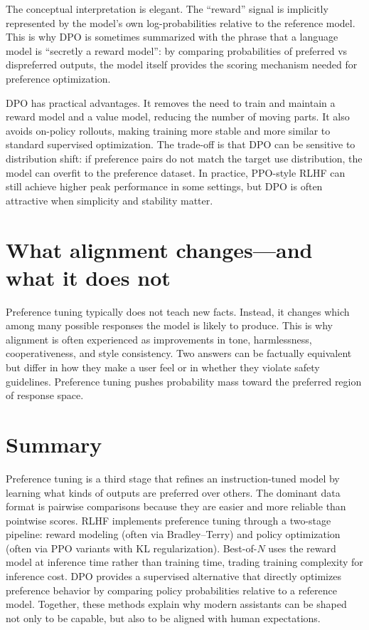 The conceptual interpretation is elegant. The “reward” signal is implicitly represented by the model’s own log-probabilities relative to the reference model. This is why DPO is sometimes summarized with the phrase that a language model is “secretly a reward model”: by comparing probabilities of preferred vs dispreferred outputs, the model itself provides the scoring mechanism needed for preference optimization.

DPO has practical advantages. It removes the need to train and maintain a reward model and a value model, reducing the number of moving parts. It also avoids on-policy rollouts, making training more stable and more similar to standard supervised optimization. The trade-off is that DPO can be sensitive to distribution shift: if preference pairs do not match the target use distribution, the model can overfit to the preference dataset. In practice, PPO-style RLHF can still achieve higher peak performance in some settings, but DPO is often attractive when simplicity and stability matter.

\section{What alignment changes—and what it does not}
Preference tuning typically does not teach new facts. Instead, it changes which among many possible responses the model is likely to produce. This is why alignment is often experienced as improvements in tone, harmlessness, cooperativeness, and style consistency. Two answers can be factually equivalent but differ in how they make a user feel or in whether they violate safety guidelines. Preference tuning pushes probability mass toward the preferred region of response space.

\section{Summary}
Preference tuning is a third stage that refines an instruction-tuned model by learning what kinds of outputs are preferred over others. The dominant data format is pairwise comparisons because they are easier and more reliable than pointwise scores. RLHF implements preference tuning through a two-stage pipeline: reward modeling (often via Bradley--Terry) and policy optimization (often via PPO variants with KL regularization). Best-of-\(N\) uses the reward model at inference time rather than training time, trading training complexity for inference cost. DPO provides a supervised alternative that directly optimizes preference behavior by comparing policy probabilities relative to a reference model. Together, these methods explain why modern assistants can be shaped not only to be capable, but also to be aligned with human expectations.

